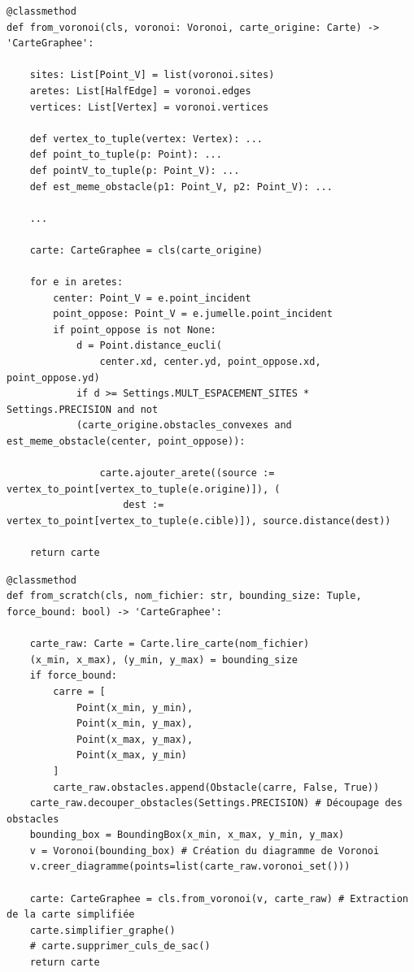 \begin{frame}[fragile]
\begin{code}
\begin{verbatim}
@classmethod
def from_voronoi(cls, voronoi: Voronoi, carte_origine: Carte) -> 'CarteGraphee':

    sites: List[Point_V] = list(voronoi.sites)
    aretes: List[HalfEdge] = voronoi.edges
    vertices: List[Vertex] = voronoi.vertices

    def vertex_to_tuple(vertex: Vertex): ...
    def point_to_tuple(p: Point): ...
    def pointV_to_tuple(p: Point_V): ...
    def est_meme_obstacle(p1: Point_V, p2: Point_V): ...

    ...

    carte: CarteGraphee = cls(carte_origine)
    
    for e in aretes:
        center: Point_V = e.point_incident
        point_oppose: Point_V = e.jumelle.point_incident
        if point_oppose is not None:
            d = Point.distance_eucli(
                center.xd, center.yd, point_oppose.xd, point_oppose.yd)
            if d >= Settings.MULT_ESPACEMENT_SITES * Settings.PRECISION and not 
            (carte_origine.obstacles_convexes and est_meme_obstacle(center, point_oppose)):
    
                carte.ajouter_arete((source := vertex_to_point[vertex_to_tuple(e.origine)]), (
                    dest := vertex_to_point[vertex_to_tuple(e.cible)]), source.distance(dest))
    
    return carte
\end{verbatim}
\end{code}
\end{frame}


\begin{frame}[fragile]
\begin{code}
\begin{verbatim}
@classmethod
def from_scratch(cls, nom_fichier: str, bounding_size: Tuple, force_bound: bool) -> 'CarteGraphee':

    carte_raw: Carte = Carte.lire_carte(nom_fichier)
    (x_min, x_max), (y_min, y_max) = bounding_size
    if force_bound:
        carre = [
            Point(x_min, y_min),
            Point(x_min, y_max),
            Point(x_max, y_max),
            Point(x_max, y_min)
        ]
        carte_raw.obstacles.append(Obstacle(carre, False, True))
    carte_raw.decouper_obstacles(Settings.PRECISION) # Découpage des obstacles
    bounding_box = BoundingBox(x_min, x_max, y_min, y_max)
    v = Voronoi(bounding_box) # Création du diagramme de Voronoi
    v.creer_diagramme(points=list(carte_raw.voronoi_set()))

    carte: CarteGraphee = cls.from_voronoi(v, carte_raw) # Extraction de la carte simplifiée
    carte.simplifier_graphe()
    # carte.supprimer_culs_de_sac()
    return carte
\end{verbatim}
\end{code}
\end{frame}


